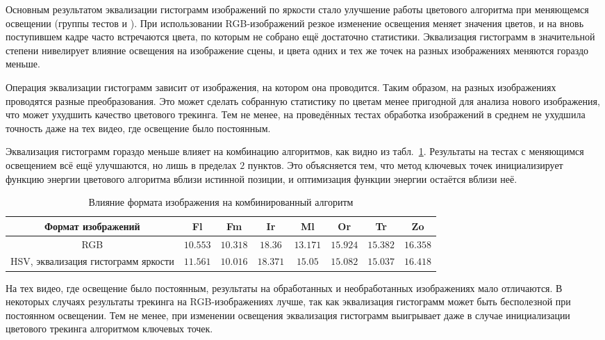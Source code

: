 Основным результатом эквализации гистограмм изображений по яркости стало улучшение работы цветового алгоритма при меняющемся освещении (группы тестов  и ).
При использовании RGB-изображений резкое изменение освещения меняет значения цветов, и на вновь поступившем кадре часто встречаются цвета, по которым не собрано ещё достаточно статистики.
Эквализация гистограмм в значительной степени нивелирует влияние освещения на изображение сцены, и цвета одних и тех же точек на разных изображениях меняются гораздо меньше.

Операция эквализации гистограмм зависит от изображения, на котором она проводится. 
Таким образом, на разных изображениях проводятся разные преобразования. 
Это может сделать собранную статистику по цветам менее пригодной для анализа нового изображения, что может ухудшить качество цветового трекинга.
Тем не менее, на проведённых тестах обработка изображений в среднем не ухудшила точность даже на тех видео, где освещение было постоянным.


Эквализация гистограмм гораздо меньше влияет на комбинацию алгоритмов, как видно из табл.~\ref{tab:hsv_lkt_init}. 
Результаты на тестах с меняющимся освещением всё ещё улучшаются, но лишь в пределах $2$ пунктов.
Это объясняется тем, что метод ключевых точек инициализирует функцию энергии цветового алгоритма вблизи истинной позиции, и оптимизация функции энергии остаётся вблизи неё.

\begin{table}[h]
\caption{\label{tab:hsv_lkt_init}Влияние формата изображения на комбинированный алгоритм}
\begin{center}
\begin{tabular}{|c|c|c|c|c|c|c|c|}
\hline
Формат изображений                          & Fl           & Fm          & Ir            & Ml           & Or           & Tr          & Zo  \\
\hline
RGB                                                     & $10.553$  & $10.318$   & $18.36$ & $13.171$ & $15.924$ & $15.382$  & $16.358$ \\
\hline
HSV, эквализация гистограмм яркости & $11.561$ & $10.016$ & $18.371$ & $15.05$  & $15.082$  & $15.037$ & $16.418$ \\
\hline
\end{tabular}
\end{center}
\end{table}

На тех видео, где освещение было постоянным, результаты на обработанных и необработанных изображениях мало отличаются. 
В некоторых случаях результаты трекинга на RGB-изображениях лучше, так как эквализация гистограмм может быть бесполезной при постоянном освещении.
Тем не менее, при изменении освещения эквализация гистограмм выигрывает даже в случае инициализации цветового трекинга алгоритмом ключевых точек.


